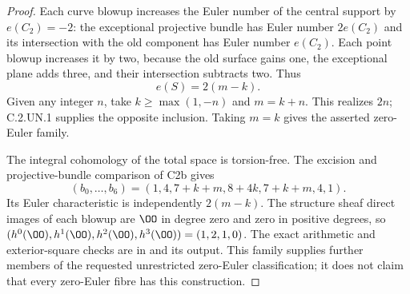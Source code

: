 \begin{proof}
Each curve blowup increases the Euler number of the central
support by $e(C_2)=-2$: the exceptional projective bundle has Euler
number $2e(C_2)$ and its intersection with the old component has
Euler number $e(C_2)$. Each point blowup increases it by two,
because the old surface gains one, the exceptional plane adds
three, and their intersection subtracts two. Thus
\[
                         e(S)=2(m-k).                 \tag{C.UN.5}
\]
Given any integer $n$, take $k\ge\max(1,-n)$ and $m=k+n$.
This realizes $2n$; C.2.UN.1 supplies the opposite inclusion.
Taking $m=k$ gives the asserted zero-Euler family.

The integral cohomology of the total space is torsion-free. The
excision and projective-bundle comparison of C2b gives
\[
 (b_0,\ldots,b_6)
      =(1,4,7+k+m,8+4k,7+k+m,4,1).                  \tag{C.UN.6}
\]
Its Euler characteristic is independently $2(m-k)$. The structure
sheaf direct images of each blowup are $\OO$ in degree zero and
zero in positive degrees, so
$(h^0(\OO),h^1(\OO),h^2(\OO),h^3(\OO))=(1,2,1,0)$.
The exact arithmetic and exterior-square checks are in
 and its output.
This family supplies further members of the requested unrestricted
zero-Euler classification; it does not claim that every zero-Euler
fibre has this construction.
\end{proof}
